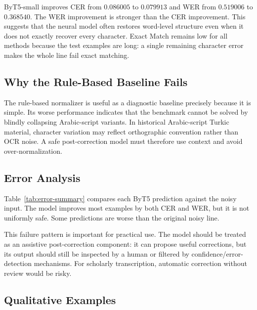 \documentclass{article}
\begin{document}
ByT5-small improves CER from $0.086005$ to $0.079913$ and WER from $0.519006$ to $0.368540$. The WER improvement is stronger than the CER improvement. This suggests that the neural model often restores word-level structure even when it does not exactly recover every character. Exact Match remains low for all methods because the test examples are long: a single remaining character error makes the whole line fail exact matching.

\subsection{Why the Rule-Based Baseline Fails}

The rule-based normalizer is useful as a diagnostic baseline precisely because it is simple. Its worse performance indicates that the benchmark cannot be solved by blindly collapsing Arabic-script variants. In historical Arabic-script Turkic material, character variation may reflect orthographic convention rather than OCR noise. A safe post-correction model must therefore use context and avoid over-normalization.

\subsection{Error Analysis}

Table~\ref{tab:error-summary} compares each ByT5 prediction against the noisy input. The model improves most examples by both CER and WER, but it is not uniformly safe. Some predictions are worse than the original noisy line.

\begin{table}[tbh!]
\begin{center}

\caption{Per-sample error analysis for ByT5-small 512 compared with the noisy input.}
\label{tab:error-summary}
\end{center}
\end{table}

This failure pattern is important for practical use. The model should be treated as an assistive post-correction component: it can propose useful corrections, but its output should still be inspected by a human or filtered by confidence/error-detection mechanisms. For scholarly transcription, automatic correction without review would be risky.

\subsection{Qualitative Examples}
\end{document}
